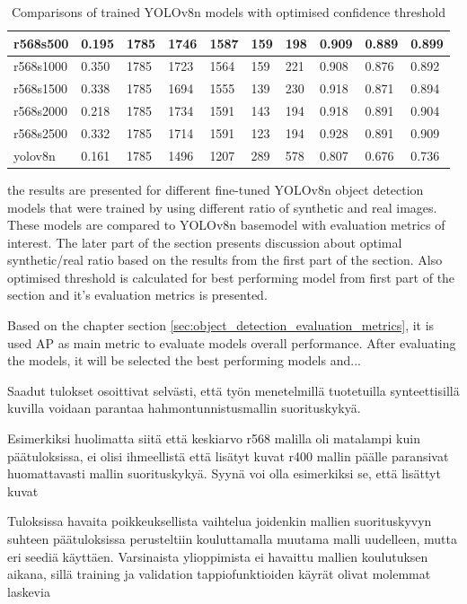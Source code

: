\begin{table}[ht]
\begin{tabular}{|p{2cm}|p{1cm}|p{1cm}|p{1cm}|p{1cm}|p{1cm}|p{1cm}|p{1cm}|p{1cm}|p{1cm}|}
r568s500     & 0.195 & 1785 & 1746 & 1587 & 159 & 198 & 0.909 & 0.889 & 0.899 \\ \hline
r568s1000    & 0.350 & 1785 & 1723 & 1564 & 159 & 221 & 0.908 & 0.876 & 0.892 \\ \hline
r568s1500    & 0.338 & 1785 & 1694 & 1555 & 139 & 230 & 0.918 & 0.871 & 0.894 \\ \hline
r568s2000    & 0.218 & 1785 & 1734 & 1591 & 143 & 194 & 0.918 & 0.891 & 0.904 \\ \hline
r568s2500    & 0.332 & 1785 & 1714 & 1591 & 123 & 194 & 0.928 & 0.891 & 0.909 \\ \hline
yolov8n      & 0.161 & 1785 & 1496 & 1207 & 289 & 578 & 0.807 & 0.676 & 0.736 \\ \hline
\end{tabular}
\caption{Comparisons of trained YOLOv8n models with optimised confidence threshold}
\label{tab:object_detection_metrics}
\end{table}


the results are presented for different fine-tuned YOLOv8n object detection models that were trained by using different ratio of synthetic and real images. These models are compared to YOLOv8n basemodel with evaluation metrics of interest. The later part of the section presents discussion about optimal synthetic/real ratio based on the results from the first part of the section. Also optimised threshold is calculated for best performing model from first part of the section and it's evaluation metrics is presented.

Based on the chapter section \ref{sec:object_detection_evaluation_metrics}, it is used AP as main metric to evaluate models overall performance. 
After evaluating the models, it will be selected the best performing models and...


Saadut tulokset osoittivat selvästi, että työn menetelmillä tuotetuilla synteettisillä kuvilla voidaan parantaa hahmontunnistusmallin suorituskykyä. 

Esimerkiksi huolimatta siitä että keskiarvo r568 malilla oli matalampi kuin päätuloksissa, ei olisi ihmeellistä että lisätyt kuvat r400 mallin päälle paransivat huomattavasti mallin suorituskykyä. Syynä voi olla esimerkiksi se, että lisättyt kuvat 

Tuloksissa havaita poikkeuksellista vaihtelua joidenkin mallien suorituskyvyn suhteen päätuloksissa perusteltiin kouluttamalla muutama malli uudelleen, mutta eri seediä käyttäen. Varsinaista ylioppimista ei havaittu mallien koulutuksen aikana, sillä training ja validation tappiofunktioiden käyrät olivat molemmat laskevia

